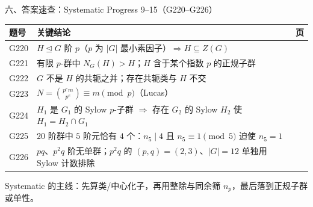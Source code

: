 \documentclass[aspectratio=169,10pt,fontset=none]{ctexbeamer}
\begin{document}
\begin{frame}[t]{六、答案速查：Systematic Progress 9--15（G220--G226）}
  \centering
  \scriptsize
  \setlength{\tabcolsep}{3pt}
  \renewcommand{\arraystretch}{1.22}
  \begin{tabular}{@{}l p{10.0cm} c@{}}
    \toprule
    题号 & 关键结论 & 页\\
    \midrule
    G220 & $H\trianglelefteq G$ 阶 $p$（$p$ 为 $|G|$ 最小素因子）$\Rightarrow H\subseteq Z(G)$ & \pageref{ex:G220}\\
    G221 & 有限 $p$-群中 $N_G(H)>H$；$H$ 含于某个指数 $p$ 的正规子群 & \pageref{ex:G221}\\
    G222 & $G$ 不是 $H$ 的共轭之并；存在共轭类与 $H$ 不交 & \pageref{ex:G222}\\
    G223 & $N=\binom{p^e m}{p^e}\equiv m\pmod p$（Lucas） & \pageref{ex:G223}\\
    G224 & $H_1$ 是 $G_1$ 的 Sylow $p$-子群 $\Rightarrow$ 存在 $G_2$ 的 Sylow $H_2$ 使 $H_1=H_2\cap G_1$ & \pageref{ex:G224}\\
    G225 & $20$ 阶群中 $5$ 阶元恰有 $4$ 个：$n_5\mid4$ 且 $n_5\equiv1\pmod5$ 迫使 $n_5=1$ & \pageref{ex:G225}\\
    G226 & $pq$、$p^2q$ 阶无单群；$p^2q$ 的 $(p,q)=(2,3)$、$|G|=12$ 单独用 Sylow 计数排除 & \pageref{ex:G226}\\
    \bottomrule
  \end{tabular}
  \vspace{0.3em}
  {\scriptsize\color{ink!70} Systematic 的主线：先算类/中心化子，再用整除与同余筛 $n_p$，最后落到正规子群或单性。}
\end{frame}
\end{document}
